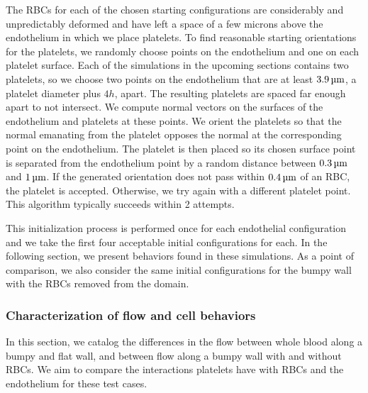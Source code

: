 The RBCs for each of the chosen starting configurations are considerably and
unpredictably deformed and have left a space of a few microns above the endothelium
in which we place platelets. To find reasonable starting orientations for the platelets,
we randomly choose points on the endothelium and one on each platelet surface. Each of
the simulations in the upcoming sections contains two platelets, so we choose two points
on the endothelium that are at least $3.9\um$, a platelet diameter plus $4h$, apart. The
resulting platelets are spaced far enough apart to not intersect. We compute normal
vectors on the surfaces of the endothelium and platelets at these points. We orient the
platelets so that the normal emanating from the platelet opposes the normal at the
corresponding point on the endothelium. The platelet is then placed so its chosen surface
point is separated from the endothelium point by a random distance between $0.3\um$ and
$1\um$. If the generated orientation does not pass within $0.4\um$ of an RBC, the
platelet is accepted. Otherwise, we try again with a different platelet point. This
algorithm typically succeeds within 2 attempts.

This initialization process is performed once for each endothelial configuration and we
take the first four acceptable initial configurations for each. In the following section,
we present behaviors found in these simulations. As a point of comparison, we also
consider the same initial configurations for the bumpy wall with the RBCs removed from
the domain.

\subsubsection{Characterization of flow and cell behaviors}

In this section, we catalog the differences in the flow between whole blood along a bumpy
and flat wall, and between flow along a bumpy wall with and without RBCs. We aim to
compare the interactions platelets have with RBCs and the endothelium for these test
cases.

